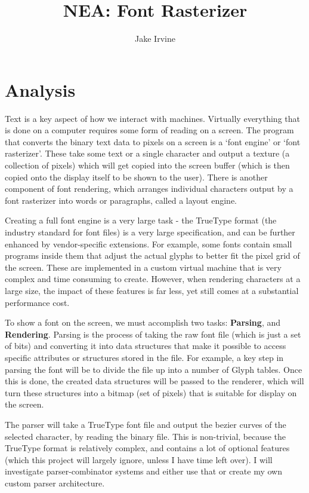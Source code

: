 \documentclass{report}
\begin{document}
\title{NEA: Font Rasterizer}
\author{Jake Irvine}

\maketitle
\chapter{Analysis}

Text is a key aspect of how we interact with machines. Virtually everything that
is done on a computer requires some form of reading on a screen. The program
that converts the binary text data to pixels on a screen is a `font engine' or
`font rasterizer'. These take some text or a single character and output a
texture (a collection of pixels) which will get copied into the screen buffer
(which is then copied onto the display itself to be shown to the user). There is
another component of font rendering, which arranges individual characters output
by a font rasterizer into words or paragraphs, called a layout engine.

Creating a full font engine is a very large task - the TrueType format (the
industry standard for font files) is a very large specification, and can be
further enhanced by vendor-specific extensions. For example, some fonts contain
small programs inside them that adjust the actual glyphs to better fit the pixel
grid of the screen. These are implemented in a custom virtual machine that is
very complex and time consuming to create. However, when rendering characters at
a large size, the impact of these features is far less, yet still comes at a
substantial performance cost.

To show a font on the screen, we must accomplish two tasks: \textbf{Parsing},
and \textbf{Rendering}. Parsing is the process of taking the raw font file
(which is just a set of bits) and converting it into data structures that make
it possible to access specific attributes or structures stored in the file. For
example, a key step in parsing the font will be to divide the file up into a
number of Glyph tables. Once this is done, the created data structures will be
passed to the renderer, which will turn these structures into a bitmap (set of
pixels) that is suitable for display on the screen.

The parser will take a TrueType font file and output the bezier curves of the
selected character, by reading the binary file. This is non-trivial, because the
TrueType format is relatively complex, and contains a lot of optional features
(which this project will largely ignore, unless I have time left over). I will
investigate parser-combinator systems and either use that or create my own
custom parser architecture.
\end{document}
